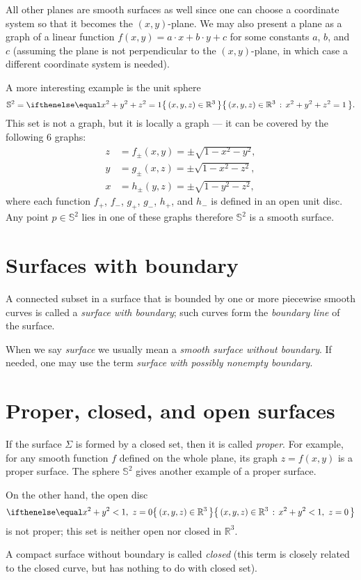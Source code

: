 All other planes are smooth surfaces as well since one can choose a coordinate system so that it becomes the $(x,y)$-plane.
We may also present a plane as a graph of a linear function 
$f(x,y)=a\cdot x+b\cdot y+c$ for some constants $a$, $b$, and $c$
(assuming the plane is not perpendicular to the $(x,y)$-plane, in which case a different coordinate system is needed).

A more interesting example is the unit sphere 
\[\mathbb{S}^2=\set{(x,y,z)\in\mathbb{R}^3}{x^2+y^2+z^2=1}.\]
This set is not a graph,
but it is locally a graph ---
it can be covered by the following 6 graphs:
\begin{align*}
z&=f_\pm(x,y)=\pm \sqrt{1-x^2-y^2},
\\
y&=g_\pm(x,z)=\pm \sqrt{1-x^2-z^2},
\\
x&=h_\pm(y,z)=\pm \sqrt{1-y^2-z^2},
\end{align*}
where each function $f_+$, $f_-$, $g_+$, $g_-$, $h_+$, and $h_-$ is defined in an open unit disc.
Any point $p\in\mathbb{S}^2$ lies in one of these graphs therefore $\mathbb{S}^2$ is a smooth surface.

\section{Surfaces with boundary}
A connected subset in a surface that is bounded by one or more piecewise
smooth curves is called a \emph{surface with boundary}; such curves form the \emph{boundary line} of the surface.

When we say {}\emph{surface} we usually mean a {}\emph{smooth surface without boundary}.
If needed, one may use the term {}\emph{surface with possibly nonempty boundary}.

\section{Proper, closed, and open surfaces}
If the surface $\Sigma$ is formed by a closed set, then it is called \emph{proper}.
For example, for any smooth function $f$ defined on the whole plane, its graph $z=f(x,y)$ is a proper surface.
The sphere $\mathbb{S}^2$ gives another example of a proper surface.

On the other hand, the open disc 
\[\set{(x,y,z)\in\mathbb{R}^3}{x^2+y^2<1,\  z=0}\]
is not proper; this set is neither open nor closed in $\mathbb{R}^3$.

A compact surface without boundary is called \emph{closed}
(this term is closely related to the closed curve, but has nothing to do with closed set).

